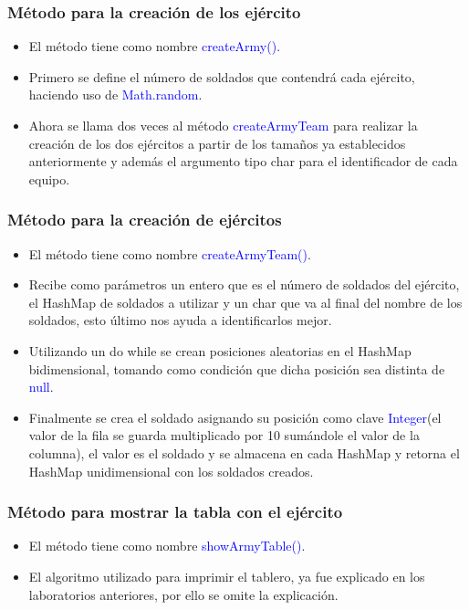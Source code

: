 \documentclass{article}
\begin{document}
\subsubsection{Método para la creación de los ejército}
\begin{itemize}
    \item El método tiene como nombre \textcolor{blue}{createArmy()}.
    \item Primero se define el número de soldados que contendrá cada ejército, haciendo uso de \textcolor{blue}{Math.random}.
    \item Ahora se llama dos veces al método \textcolor{blue}{createArmyTeam} para realizar la creación de los dos ejércitos a partir de los tamaños ya establecidos anteriormente y además el argumento tipo char para el identificador de cada equipo.
\end{itemize}



\subsubsection{Método para la creación de ejércitos}
\begin{itemize}
    \item El método tiene como nombre \textcolor{blue}{createArmyTeam()}.
    \item Recibe como parámetros un entero que es el número de soldados del ejército, el HashMap de soldados a utilizar y un char que va al final del nombre de los soldados, esto último nos ayuda a identificarlos mejor.
    \item Utilizando un do while se crean posiciones aleatorias en el HashMap bidimensional, tomando como condición que dicha posición sea distinta de \textcolor{blue}{null}.
    \item Finalmente se crea el soldado asignando su posición como clave \textcolor{blue}{Integer}(el valor de la fila se guarda multiplicado por 10 sumándole el valor de la columna), el valor es el soldado y se almacena en cada HashMap y retorna el HashMap unidimensional con los soldados creados.
\end{itemize}



\subsubsection{Método para mostrar la tabla con el ejército}
\begin{itemize}
    \item El método tiene como nombre \textcolor{blue}{showArmyTable()}.
    \item El algoritmo utilizado para imprimir el tablero, ya fue explicado en los laboratorios anteriores, por ello se omite la explicación.
\end{itemize}

\end{document}

